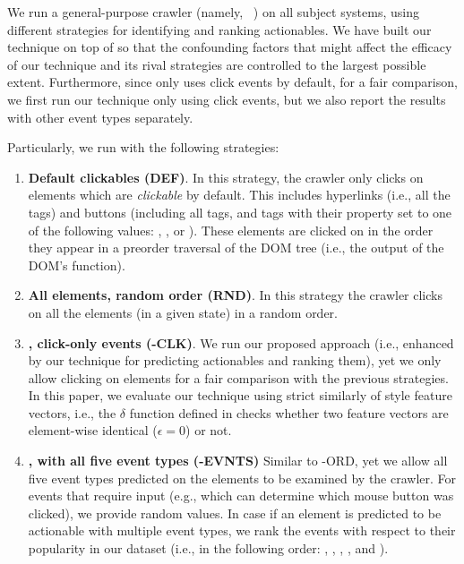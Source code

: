 We run a general-purpose crawler (namely, \crawljax~\cite{Mesbah:2012:Crawljax})
on all subject systems,
using different strategies
for identifying and ranking actionables.
We have built our technique on top of \crawljax
so that the confounding factors that might affect the efficacy of our technique and its rival strategies 
are controlled to the largest possible extent. 
Furthermore, since \crawljax only uses click events by default, 
for a fair comparison,
we first run our technique only using click events,
but we also report the results with other event types separately.

Particularly, we run \crawljax with the following strategies:

\begin{enumerate}[leftmargin=*]

\item \textbf{Default clickables (DEF)}.
In this strategy, the crawler only clicks on elements
which are \textit{clickable} by default. 
This includes hyperlinks (i.e., all the  tags)
and buttons (including all  tags, 
and  tags with their  property
set to one of the following values: , , or ).
These elements are clicked on in the order 
they appear in a preorder traversal of the DOM tree
(i.e., the output of the DOM's  function).

\item \textbf{All elements, random order (RND)}.
In this strategy the crawler clicks
on all the \html elements (in a given state)
in a random order.

\item \textbf{\toolName, click-only events (\toolName-CLK)}.
We run our proposed \toolName approach (i.e., \crawljax enhanced by our technique for predicting actionables
and ranking them),
yet we only allow clicking on elements
for a fair comparison with the previous strategies.
In this paper, we evaluate our technique using strict similarly of style feature vectors,
i.e., the $\delta$ function defined in 
checks whether two feature vectors are element-wise identical ($\epsilon = 0$) or not.

\item \textbf{\toolName, with all five event types (\toolName-EVNTS)}
Similar to {\toolName-ORD}, 
yet we allow all five event types predicted on the elements
to be examined by the crawler.
For events that require input
(e.g.,  which can determine which mouse button was clicked),
we provide random values.
In case if an element is predicted to be actionable
with multiple event types,
we rank the events with respect to their popularity in our dataset
(i.e., in the following order: , , , , and ).

\end{enumerate}

